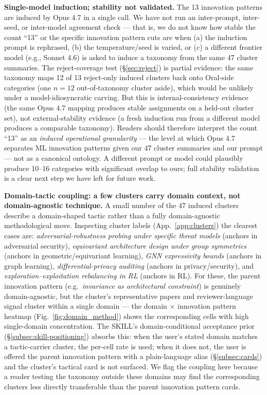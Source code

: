 \documentclass[10pt,a4paper]{article}
\begin{document}
\textbf{Single-model induction; stability not validated.} The 13 innovation patterns are induced by Opus 4.7 in a single call. We have not run an inter-prompt, inter-seed, or inter-model agreement check — that is, we do not know how stable the count ``13'' or the specific innovation pattern cuts are when (a) the induction prompt is rephrased, (b) the temperature/seed is varied, or (c) a different frontier model (e.g., Sonnet 4.6) is asked to induce a taxonomy from the same 47 cluster summaries. The reject-coverage test (\S\ref{sec:reject}) is partial evidence: the same taxonomy maps 12 of 13 reject-only induced clusters back onto Oral-side categories (one $n{=}12$ out-of-taxonomy cluster aside), which would be unlikely under a model-idiosyncratic carving. But this is internal-consistency evidence (the same Opus 4.7 mapping produces stable assignments on a held-out cluster set), not external-stability evidence (a fresh induction run from a different model produces a comparable taxonomy). Readers should therefore interpret the count ``13'' as an \emph{induced operational granularity} — the level at which Opus 4.7 separates ML innovation patterns given our 47 cluster summaries and our prompt — not as a canonical ontology. A different prompt or model could plausibly produce 10--16 categories with significant overlap to ours; full stability validation is a clear next step we have left for future work.

\textbf{Domain-tactic coupling: a few clusters carry domain context, not domain-agnostic technique.} A small number of the 47 induced clusters describe a domain-shaped tactic rather than a fully domain-agnostic methodological move. Inspecting cluster labels (App.~\ref{app:clusters}) the clearest cases are: \emph{adversarial-robustness probing under specific threat models} (anchors in adversarial security), \emph{equivariant architecture design under group symmetries} (anchors in geometric/equivariant learning), \emph{GNN expressivity bounds} (anchors in graph learning), \emph{differential-privacy auditing} (anchors in privacy/security), and \emph{exploration--exploitation rebalancing in RL} (anchors in RL). For these, the parent innovation pattern (e.g.\ \emph{invariance as architectural constraint}) is genuinely domain-agnostic, but the cluster's representative papers and reviewer-language signal cluster within a single domain --- the domain $\times$ innovation pattern heatmap (Fig.~\ref{fig:domain_method}) shows the corresponding cells with high single-domain concentration. The SKILL's domain-conditional acceptance prior (\S\ref{subsec:skill-positioning}) absorbs this: when the user's stated domain matches a tactic-carrier cluster, the per-cell rate is used; when it does not, the user is offered the parent innovation pattern with a plain-language alias (\S\ref{subsec:cards}) and the cluster's tactical card is not surfaced. We flag the coupling here because a reader testing the taxonomy outside these domains may find the corresponding clusters less directly transferable than the parent innovation pattern cards.
\end{document}
